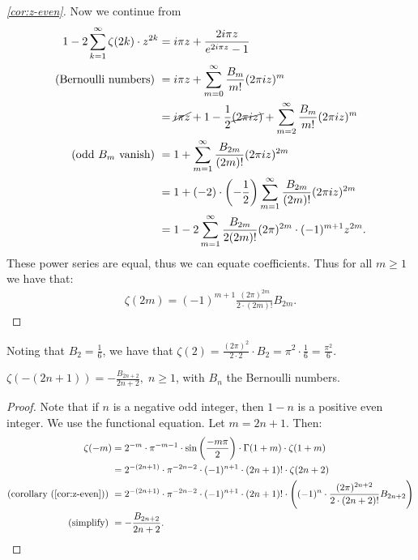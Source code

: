 \begin{proof}[\ref{cor:z-even}]
Now we continue from
\begin{align*}
    1 - 2 \sum_{k=1}^\infty \zeta(2k) \cdot z^{2k} &= i \pi z + \frac{2i \pi z}{e^{2 i \pi z} - 1}\\
    \text{(Bernoulli numbers) }&= i \pi z + \sum_{m=0}^\infty \frac{B_m}{m!} (2 \pi i z)^m\\
    &= \cancel{i \pi z} + 1 - \frac{1}{2}\cancel{(2 \pi i z)} + \sum_{m=2}^\infty \frac{B_m}{m!} (2 \pi i z)^m\\
    \text{(odd $B_m$ vanish) } &= 1 + \sum_{m=1}^\infty \frac{B_{2m}}{(2m)!} (2 \pi i z)^{2m}\\
    &= 1 + (-2) \cdot \left( -\frac{1}{2} \right) \sum_{m=1}^\infty \frac{B_{2m}}{(2m)!} (2 \pi i z)^{2m}\\
    &= 1 - 2\sum_{m=1}^\infty \frac{B_{2m}}{2 (2m)!} (2 \pi)^{2m} \cdot (-1)^{m+1} z^{2m}.
\end{align*}
These power series are equal, thus we can equate coefficients. Thus for all $m \geq 1$ we have that:
\begin{align*}
    \zeta(2m) = (-1)^{m+1} \frac{(2\pi)^{2m}}{2 \cdot (2m)!} B_{2m}.
\end{align*}

\end{proof}

\begin{example} Noting that $B_2 = \frac{1}{6}$, we have that $\zeta(2) = \frac{(2\pi)^2}{2\cdot 2}\cdot B_2 = \pi ^ 2 \cdot \frac{1}{6} = \frac{\pi ^2 }{6}$.
\end{example}

\begin{corollary}\label{cor:z-neg-odd}
$\zeta(-(2n+1))= - \frac{B_{2n+2}}{2n+2}, \; n \geq 1$, with $B_n$ the Bernoulli numbers.
\end{corollary}

\begin{proof}
Note that if $n$ is a negative odd integer, then $1-n$ is a positive even integer. We use the functional equation. Let $m = 2n+1$. Then:
\begin{align*}
    \zeta(-m) &= 2^{-m} \cdot \pi^{-m-1} \cdot \sin\left( \frac{- m \pi}{2} \right) \cdot \Gamma(1+m) \cdot \zeta(1+m)\\
    &= 2^{-(2n+1)} \cdot \pi^{-2n-2} \cdot (-1)^{n+1} \cdot (2n+1)! \cdot \zeta(2n+2)\\
    \text{(corollary (\ref{cor:z-even})) } &= 2^{-(2n+1)} \cdot \pi^{-2n-2} \cdot (-1)^{n+1} \cdot (2n+1)! \cdot \left( (-1)^n \cdot \frac{(2 \pi)^{2n+2}}{2 \cdot (2n+2)!} B_{2n+2}  \right)\\
    \text{(simplify) }&= - \frac{B_{2n+2}}{2n+2}.
\end{align*}
\end{proof}

